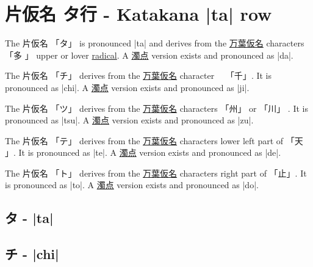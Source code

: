 \section{片仮名  タ行 - Katakana |ta| row}


 The  片仮名 {「タ」} is pronounced  |ta| and  derives from the
\hyperref[sec:Manyogana]{万葉仮名} characters {「多 」} upper or lover
\hyperref[sec:Radical]{radical}.  A \hyperref[sec:Dakuten]{濁点} version exists
and pronounced as |da|.

 The 片仮名 {「チ」} derives from the
\hyperref[sec:Manyogana]{万葉仮名} character　 {「千」}.  It is pronounced as
|chi|.  A \hyperref[sec:Dakuten]{濁点} version exists and pronounced as |ji|.

 The 片仮名 {「ツ」} derives from the
\hyperref[sec:Manyogana]{万葉仮名} characters {「州」} or {「川」} .  It is
pronounced as |tsu|.  A \hyperref[sec:Dakuten]{濁点} version exists and
pronounced as |zu|. 

 The 片仮名 {「テ」} derives from the
\hyperref[sec:Manyogana]{万葉仮名} characters lower left part of {「天 」}.  It
is pronounced as |te|.  A \hyperref[sec:Dakuten]{濁点} version exists and
pronounced as |de|.  

\newpage

 The 片仮名 {「ト」} derives from the
\hyperref[sec:Manyogana]{万葉仮名} characters right part of {「止」}.  It is
pronounced as |to|.  A \hyperref[sec:Dakuten]{濁点} version exists and
pronounced as |do|.

 


\newpage

\subsection{タ - |ta|} \label{sec:KatakanaTa}


\subsection{チ - |chi|} \label{sec:KatakanaChi}

